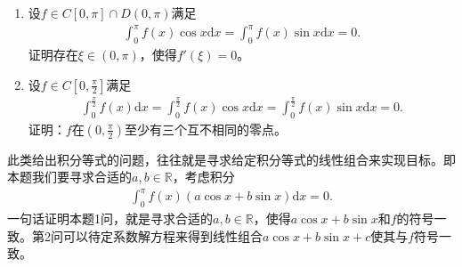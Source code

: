 \documentclass[../../main.tex]{subfiles}
\begin{document}
\begin{example}
\begin{enumerate}
\item 设$f\in C[0,\pi]\cap D(0,\pi)$满足
\begin{align*}
\int_0^\pi f(x)\cos x\mathrm{d}x = \int_0^\pi f(x)\sin x\mathrm{d}x = 0.
\end{align*}
证明存在$\xi\in(0,\pi)$，使得$f'(\xi)=0$。

\item 设$f\in C[0,\frac{\pi}{2}]$满足
\begin{align}\label{example0.12-11.64}
\int_0^{\frac{\pi}{2}} f(x)\mathrm{d}x = \int_0^{\frac{\pi}{2}} f(x)\cos x\mathrm{d}x = \int_0^{\frac{\pi}{2}} f(x)\sin x\mathrm{d}x = 0.
\end{align}
证明：$f$在$(0,\frac{\pi}{2})$至少有三个互不相同的零点。
\end{enumerate}
\end{example}
\begin{note}
此类给出积分等式的问题，往往就是寻求给定积分等式的线性组合来实现目标。即本题我们要寻求合适的$a,b\in\mathbb{R}$，考虑积分
\begin{align*}
\int_0^\pi f(x)(a\cos x + b\sin x)\mathrm{d}x = 0.
\end{align*}
一句话证明本题1问，就是寻求合适的$a,b\in\mathbb{R}$，使得$a\cos x + b\sin x$和$f$的符号一致。第2问可以待定系数解方程来得到线性组合$a\cos x+b\sin x+c$使其与$f$符号一致。
\end{note}
\end{document}
